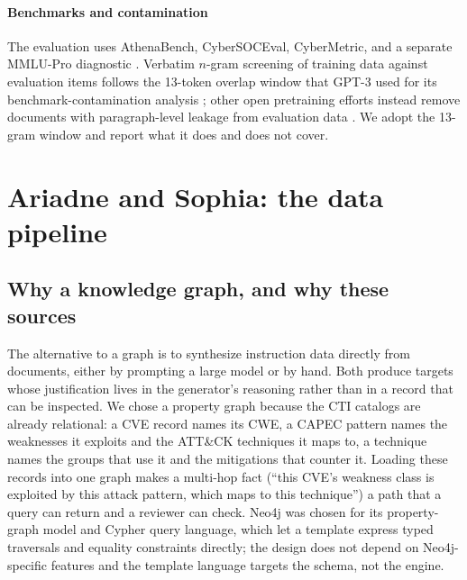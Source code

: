 \documentclass[preprint,12pt,authoryear]{elsarticle}
\begin{document}
\paragraph{Benchmarks and contamination}
The evaluation uses AthenaBench, CyberSOCEval, CyberMetric, and a separate MMLU-Pro diagnostic \citep{alam2025athenabench,deason2025cybersoceval,tihanyi2024cybermetric,wang2024mmlupro}. Verbatim $n$-gram screening of training data against evaluation items follows the 13-token overlap window that GPT-3 used for its benchmark-contamination analysis \citep{brown2020gpt3}; other open pretraining efforts instead remove documents with paragraph-level leakage from evaluation data \citep{groeneveld2024olmo}. We adopt the 13-gram window and report what it does and does not cover.

\section{Ariadne and Sophia: the data pipeline}\label{sec:data}
\subsection{Why a knowledge graph, and why these sources}
The alternative to a graph is to synthesize instruction data directly from documents, either by prompting a large model or by hand. Both produce targets whose justification lives in the generator's reasoning rather than in a record that can be inspected. We chose a property graph because the CTI catalogs are already relational: a CVE record names its CWE, a CAPEC pattern names the weaknesses it exploits and the ATT\&CK techniques it maps to, a technique names the groups that use it and the mitigations that counter it. Loading these records into one graph makes a multi-hop fact (``this CVE's weakness class is exploited by this attack pattern, which maps to this technique'') a path that a query can return and a reviewer can check. Neo4j was chosen for its property-graph model and Cypher query language, which let a template express typed traversals and equality constraints directly; the design does not depend on Neo4j-specific features and the template language targets the schema, not the engine.
\end{document}
